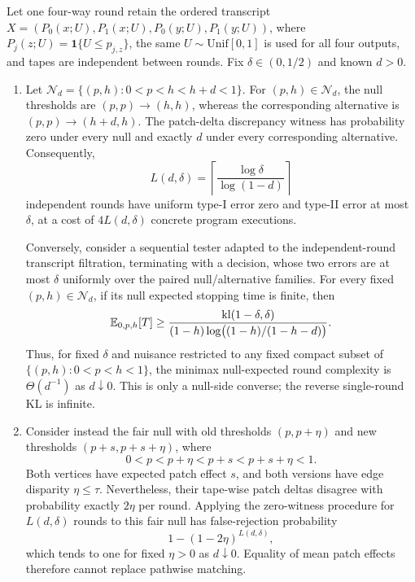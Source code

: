 \begin{proposition}
\label{prop:unknown-shared-control}
Let one four-way round retain the ordered transcript
\(
X=(P_0(x;U),P_1(x;U),P_0(y;U),P_1(y;U))
\), where \(P_j(z;U)=\mathbf 1\{U\le p_{j,z}\}\), the same
\(U\sim\mathrm{Unif}[0,1]\) is used for all four outputs, and tapes are
independent between rounds. Fix \(\delta\in(0,1/2)\) and known \(d>0\).
\begin{enumerate}[label=(\roman*)]
\item Let
\(
\mathcal N_d=\{(p,h):0<p<h<h+d<1\}
\).
For \((p,h)\in\mathcal N_d\), the null thresholds are
\((p,p)\to(h,h)\), whereas the corresponding alternative is
\((p,p)\to(h+d,h)\). The patch-delta discrepancy witness has probability
zero under every null and exactly \(d\) under every corresponding alternative.
Consequently,
\begin{equation}\label{eq:unknown-shared-horizon}
L(d,\delta)=\left\lceil\frac{\log\delta}{\log(1-d)}\right\rceil
\end{equation}
independent rounds have uniform type-I error zero and type-II error at most
\(\delta\), at a cost of \(4L(d,\delta)\) concrete program executions.

Conversely, consider a sequential tester adapted to the independent-round
transcript filtration, terminating with a decision, whose two errors are at
most \(\delta\) uniformly over the paired null/alternative families. For every
fixed \((p,h)\in\mathcal N_d\), if its null expected stopping time is finite,
then
\begin{equation}\label{eq:unknown-shared-lower}
\mathbb{E}_{0,p,h}[T]\ge
\frac{\mathrm{kl}(1-\delta,\delta)}
{(1-h)\log\bigl((1-h)/(1-h-d)\bigr)}.
\end{equation}
Thus, for fixed \(\delta\) and nuisance restricted to any fixed compact subset
of \(\{(p,h):0<p<h<1\}\), the minimax null-expected round complexity is
\(\Theta(d^{-1})\) as \(d\downarrow0\). This is only a null-side converse;
the reverse single-round KL is infinite.

\item Consider instead the fair null with old thresholds \((p,p+\eta)\) and
new thresholds \((p+s,p+s+\eta)\), where
\begin{equation}\label{eq:mean-matching-domain}
0<p<p+\eta<p+s<p+s+\eta<1.
\end{equation}
Both vertices have expected patch effect \(s\), and both versions have edge
disparity \(\eta\le\tau\). Nevertheless, their tape-wise patch deltas disagree
with probability exactly \(2\eta\) per round. Applying the zero-witness
procedure for \(L(d,\delta)\) rounds to this fair null has false-rejection
probability
\begin{equation}\label{eq:mean-matching-failure}
1-(1-2\eta)^{L(d,\delta)},
\end{equation}
which tends to one for fixed \(\eta>0\) as \(d\downarrow0\). Equality of mean
patch effects therefore cannot replace pathwise matching.
\end{enumerate}
\end{proposition}

